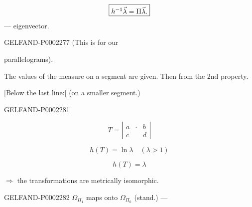 \begin{equation*}
 \fbox{$h^{-1}\vec\lambda=\Pi\vec\lambda$.}
\end{equation*}
— eigenvector.



\begin{GelfandAdjacentEvidence}{GELFAND-P000227}{7}
(This is for our


parallelograms).



The values of the measure on a segment are given. Then from the 2nd property.

[Below the last line:] (on a smaller segment.)
\end{GelfandAdjacentEvidence}







\begin{GelfandAdjacentEvidence}{GELFAND-P000228}{1}


\begin{equation*}
 T=\left|\begin{array}{ccc}a&\cdot&b\\c&&d\end{array}\right|
\end{equation*}



\begin{equation*}
 h (T)=\ln\lambda\quad (\lambda>1)
\end{equation*}



\begin{equation*}
 h (T)=\lambda
\end{equation*}
\end{GelfandAdjacentEvidence}



$\Rightarrow$ the transformations are metrically isomorphic.

\begin{GelfandAdjacentEvidence}{GELFAND-P000228}{2}
$\Omega_{\Pi_1}$ maps onto $\Omega_{\Pi_0}$ (stand.) —



\end{GelfandAdjacentEvidence}


